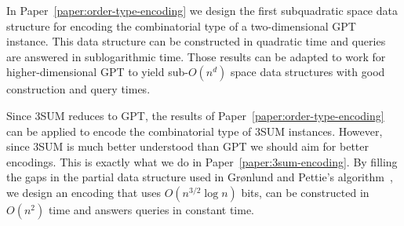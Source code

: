 In Paper~\ref{paper:order-type-encoding} we design the first subquadratic space
data structure for encoding the combinatorial type of a two-dimensional GPT
instance. This data structure can be constructed in quadratic time and queries
are answered in sublogarithmic time. Those results can be adapted to work for
higher-dimensional GPT to yield sub-\(O(n^d)\) space data structures with good
construction and query times.

Since 3SUM reduces to GPT, the results of Paper~\ref{paper:order-type-encoding}
can be applied to encode the combinatorial type of 3SUM instances. However,
since 3SUM is much better understood than GPT we should aim for better
encodings. This is exactly what we do in Paper~\ref{paper:3sum-encoding}.
By filling the gaps in the partial data structure used in Gr\o nlund and
Pettie's algorithm~\cite{GP18}, we design an encoding that uses \(O(n^{3/2}
\log n)\) bits, can be constructed in \(O(n^2)\) time and answers queries in
constant time.
